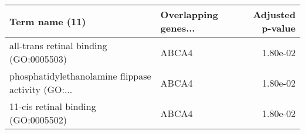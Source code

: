 \begin{tabular}{llr}
\toprule
                                    Term name (11) & Overlapping genes... &  Adjusted p-value \\
\midrule
            all-trans retinal binding (GO:0005503) &                ABCA4 &          1.80e-02 \\
phosphatidylethanolamine flippase activity (GO:... &                ABCA4 &          1.80e-02 \\
               11-cis retinal binding (GO:0005502) &                ABCA4 &          1.80e-02 \\
\bottomrule
\end{tabular}
